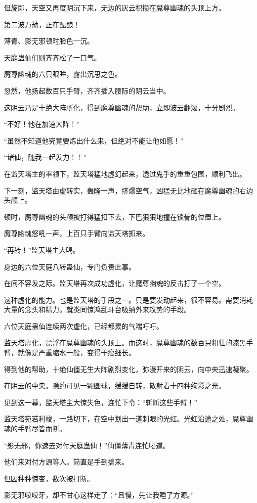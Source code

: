 \begin{this_body}
但旋即，天空又再度阴沉下来，无边的灰云积攒在魔尊幽魂的头顶上方。

第二波万劫，正在酝酿！

薄青、影无邪顿时脸色一沉。

天庭蛊仙们则齐齐松了一口气。

魔尊幽魂的六只眼眸，露出沉思之色。

忽然，他扬起数百只手臂，齐齐插入腰际的阴云当中。

这阴云乃是十绝大阵所化，得到魔尊幽魂的帮助，立即波云翻滚，十分剧烈。

“不好！他在加速大阵！”

“虽然不知道他究竟要炼出什么来，但绝对不能让他如愿！”

“诸仙，随我一起发力！！”

在监天塔主的率领下，监天塔猛地虚幻起来，透过鬼手的重重包围，顺利飞出。

下一刻，监天塔由虚转实，轰隆一声，挤爆空气，凶猛无比地砸在魔尊幽魂的右边头颅上。

顿时，魔尊幽魂的头颅被打得猛扣下去，下巴狠狠地撞在锁骨的位置上。

魔尊幽魂怒吼一声，上百只手臂向监天塔抓来。

“再转！”监天塔主大喝。

身边的六位天庭八转蛊仙，专门负责此事。

在间不容发之际。监天塔再次成功虚化，让魔尊幽魂的反击打了一个空。

这种虚化的能力。也是监天塔的手段之一。只是要发动起来，很不容易。需要消耗大量的念头和精力。就类同惊鸿乱斗台吸纳外来攻势的手段。

六位天庭蛊仙连续两次虚化，已经都累的气喘吁吁。

监天塔虚化，漂浮在魔尊幽魂的头顶上。而这时，魔尊幽魂的数百只粗壮的漆黑手臂，就像是严重缩水一般，变得干瘦细长。

得到他的帮助，十绝仙僵无生大阵剧烈变化，弥漫开来的阴云，向中央迅速凝聚。

在阴云的中央。隐约可见一颗圆球，缓缓自转，散射着十四种绚彩之光。

见到这一幕，监天塔主大惊失色，连忙下令：“斩断这些手臂！”

监天塔宛若利梭，一路切下，在空中划出一道刺眼的光虹。光虹沿途之处，魔尊幽魂的手臂尽皆而断。

“影无邪，你速去对付天庭蛊仙！”仙僵薄青连忙喝道。

他们来对付方源等人。简直是手到擒来。

但因种种惊变，数次被打断。

影无邪咬咬牙，却不甘心这样走了：“且慢，先让我睡了方源。”


\end{this_body}
